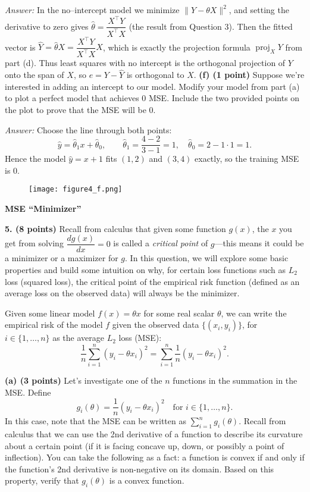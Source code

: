 \documentclass[11pt]{article}
\begin{document}
\smallskip
\noindent\textit{Answer:} In the no–intercept model we minimize $\|Y-\theta X\|^2$, and setting the derivative to zero gives 
$\hat{\theta}=\dfrac{X^\top Y}{X^\top X}$ (the result from Question 3).  
Then the fitted vector is $\hat{Y}=\hat{\theta}X=\dfrac{X^\top Y}{X^\top X}X$, which is exactly the projection formula 
$\operatorname{proj}_X Y$ from part (d).  
Thus least squares with no intercept is the orthogonal projection of $Y$ onto the span of $X$, so $e=Y-\hat{Y}$ is orthogonal to $X$.
\newpage
\noindent \textbf{(f) (1 point)} Suppose we’re interested in adding an intercept to our model. Modify your model from part (a) to plot a perfect model that achieves 0 MSE. Include the two provided points on the plot to prove that the MSE will be 0.

\noindent\textit{Answer:} Choose the line through both points:
\[
\hat y=\hat\theta_1 x+\hat\theta_0,\qquad
\hat\theta_1=\frac{4-2}{3-1}=1,\quad
\hat\theta_0=2-1\cdot 1=1.
\]
Hence the model $\boxed{\hat y=x+1}$ fits $(1,2)$ and $(3,4)$ exactly, so the training MSE is $\boxed{0}$.
\begin{figure}[h!]
    \centering
    \texttt{[image: figure4\_f.png]}
\end{figure}

\newpage

\newpage
\noindent\textbf{\LARGE MSE ``Minimizer''}

\medskip
\noindent \textbf{5. (8 points)} Recall from calculus that given some function $g(x)$, the $x$ you get from solving $\dfrac{dg(x)}{dx}=0$
is called a \textit{critical point} of $g$—this means it could be a minimizer or a maximizer for $g$.
In this question, we will explore some basic properties and build some intuition on why, for certain loss functions such as $L_2$ loss (squared loss), the critical point of the empirical risk function (defined as an average loss on the observed data) will always be the minimizer.

\medskip
Given some linear model $f(x)=\theta x$ for some real scalar $\theta$, we can write the empirical risk of the model $f$ given the observed data $\{(x_i,y_i)\}$, for $i\in\{1,\dots,n\}$ as the average $L_2$ loss (MSE):
\[
\frac{1}{n}\sum_{i=1}^{n}(y_i-\theta x_i)^2
=\sum_{i=1}^{n}\frac{1}{n}(y_i-\theta x_i)^2.
\]

\medskip
\noindent\textbf{(a) (3 points)} Let’s investigate one of the $n$ functions in the summation in the MSE. Define
\[
g_i(\theta)=\frac{1}{n}(y_i-\theta x_i)^2 \quad \text{for } i\in\{1,\dots,n\}.
\]
In this case, note that the MSE can be written as $\sum_{i=1}^{n} g_i(\theta)$.
Recall from calculus that we can use the 2nd derivative of a function to describe its curvature about a certain point (if it is facing concave up, down, or possibly a point of inflection). You can take the following as a fact: a function is convex if and only if the function’s 2nd derivative is non-negative on its domain. Based on this property, verify that $g_i(\theta)$ is a convex function.
\end{document}

